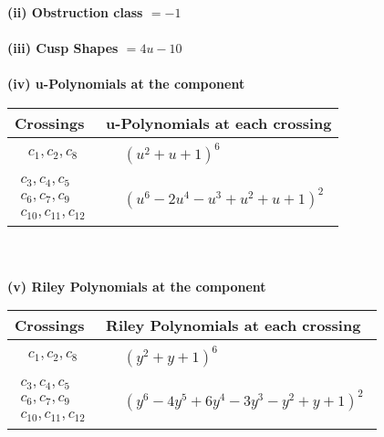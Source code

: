 \documentclass[1p]{elsarticle_modified}
\theoremstyle{definition}
\begin{document}
\flushleft \textbf{(ii) Obstruction class $= -1$}\\~\\
\flushleft \textbf{(iii) Cusp Shapes $= 4 u-10$}\\~\\
\newpage\renewcommand{\arraystretch}{1}
\flushleft \textbf{(iv) u-Polynomials at the component}\newline \\
\begin{tabular}{m{50pt}|m{274pt}}
Crossings & \hspace{64pt}u-Polynomials at each crossing \\
\hline $$\begin{aligned}c_{1},c_{2},c_{8}\end{aligned}$$&$\begin{aligned}
&(u^2+u+1)^6
\end{aligned}$\\
\hline $$\begin{aligned}c_{3},c_{4},c_{5}\\c_{6},c_{7},c_{9}\\c_{10},c_{11},c_{12}\end{aligned}$$&$\begin{aligned}
&(u^6-2 u^4- u^3+u^2+u+1)^2
\end{aligned}$\\
\hline
\end{tabular}\\~\\
\newpage\renewcommand{\arraystretch}{1}
\flushleft \textbf{(v) Riley Polynomials at the component}\newline \\
\begin{tabular}{m{50pt}|m{274pt}}
Crossings & \hspace{64pt}Riley Polynomials at each crossing \\
\hline $$\begin{aligned}c_{1},c_{2},c_{8}\end{aligned}$$&$\begin{aligned}
&(y^2+y+1)^6
\end{aligned}$\\
\hline $$\begin{aligned}c_{3},c_{4},c_{5}\\c_{6},c_{7},c_{9}\\c_{10},c_{11},c_{12}\end{aligned}$$&$\begin{aligned}
&(y^6-4 y^5+6 y^4-3 y^3- y^2+y+1)^2
\end{aligned}$\\
\hline
\end{tabular}\\~\\
\end{document}
